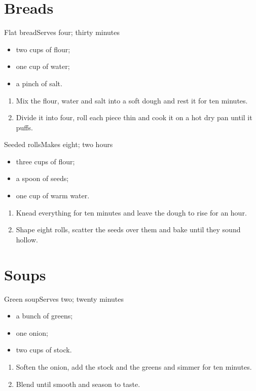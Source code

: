 \documentclass[preset=cookbook]{ltflow}
\begin{document}
\chapter{Breads}
\begin{recipe}{Flat bread}{Serves four; thirty minutes}
\begin{itemize}
\item two cups of flour;
\item one cup of water;
\item a pinch of salt.
\end{itemize}
\begin{enumerate}
\item Mix the flour, water and salt into a soft dough and rest it for ten minutes.
\item Divide it into four, roll each piece thin and cook it on a hot dry pan until it puffs.
\end{enumerate}
\end{recipe}
\begin{recipe}{Seeded rolls}{Makes eight; two hours}
\begin{itemize}
\item three cups of flour;
\item a spoon of seeds;
\item one cup of warm water.
\end{itemize}
\begin{enumerate}
\item Knead everything for ten minutes and leave the dough to rise for an hour.
\item Shape eight rolls, scatter the seeds over them and bake until they sound hollow.
\end{enumerate}
\end{recipe}
\chapter{Soups}
\begin{recipe}{Green soup}{Serves two; twenty minutes}
\begin{itemize}
\item a bunch of greens;
\item one onion;
\item two cups of stock.
\end{itemize}
\begin{enumerate}
\item Soften the onion, add the stock and the greens and simmer for ten minutes.
\item Blend until smooth and season to taste.
\end{enumerate}
\end{recipe}
\end{document}
